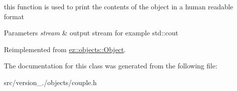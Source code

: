 this function is used to print the contents of the object in a human readable format 
\begin{DoxyParams}{Parameters}
{\em stream} & output stream for example std\+::cout \\
\hline
\end{DoxyParams}


Reimplemented from \hyperlink{classez_1_1objects_1_1Object_a9e20f39a78163f67f000576149d858b3}{ez\+::objects\+::\+Object}.



The documentation for this class was generated from the following file\+:\begin{DoxyCompactItemize}
\item 
src/version\+\_./objects/couple.\+h\end{DoxyCompactItemize}
